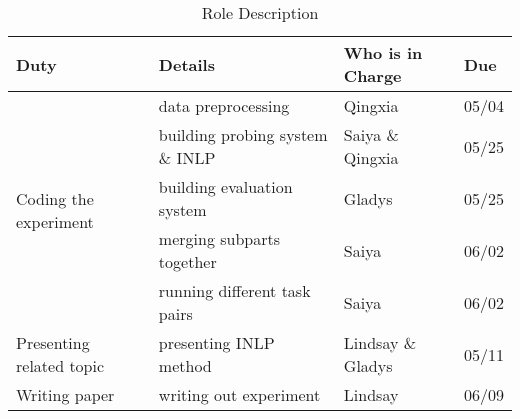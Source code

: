 \documentclass[11pt,a4paper]{article}
\begin{document}
\begin{table*}[h]
    \centering
    \begin{tabular}{llll}
    \hline
    \textbf{Duty} & \textbf{Details} & \textbf{Who is in Charge} &\textbf{Due} \\
    \hline
    \multirow{5}{*}{Coding the experiment} & data preprocessing & Qingxia & 05/04 \\
    & building probing system \& INLP & Saiya \& Qingxia & 05/25 \\
    & building evaluation system & Gladys & 05/25 \\
    & merging subparts together & Saiya & 06/02\\ 
    & running different task pairs & Saiya & 06/02\\
    \hline
    \multirow{2}{*}{Presenting related topic} & \multirow{2}{*}{presenting INLP method} & \multirow{2}{*}{Lindsay \& Gladys} & \multirow{2}{*}{05/11}\\
    & & & \\
    \hline
    \multirow{2}{*}{Writing paper} & \multirow{2}{*}{writing out experiment } & \multirow{2}{*}{Lindsay} & \multirow{2}{*}{06/09}  \\
    & & & \\
    \hline
    \end{tabular}
    \caption{\label{role description} Role Description
    }
    \end{table*}








\end{document}

